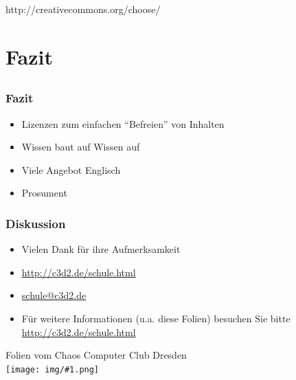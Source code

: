 \documentclass[table]{beamer}
\newcommand{\cc}[1]{\texttt{[image: img/\#1.png]}}
\begin{document}
\begin{frame}
    \begin{center}\Large
    http://creativecommons.org/choose/
    \end {center}
\end{frame}

\section{Fazit}
\subsection{}

\begin{frame}
    \frametitle{Fazit}
    \begin{itemize}
      \item<2-> Lizenzen zum einfachen ``Befreien'' von Inhalten
      \item<3-> Wissen baut auf Wissen auf
      \item<4-> Viele Angebot Englisch
      \item<5-> Prosument
    \end{itemize}
\end{frame}

\begin{frame}
    \frametitle{Diskussion}
    \begin{itemize}
        \item Vielen Dank für ihre Aufmerksamkeit
        \item \url{http://c3d2.de/schule.html}
        \item \url{schule@c3d2.de}
        \item Für weitere Informationen (u.a. diese Folien) besuchen Sie bitte \url{http://c3d2.de/schule.html}
    \end{itemize}
    \begin{center}
   Folien vom Chaos Computer Club Dresden\\
   {\cc{by-sa}}
   \end{center}
\end{frame}
\end{document}
